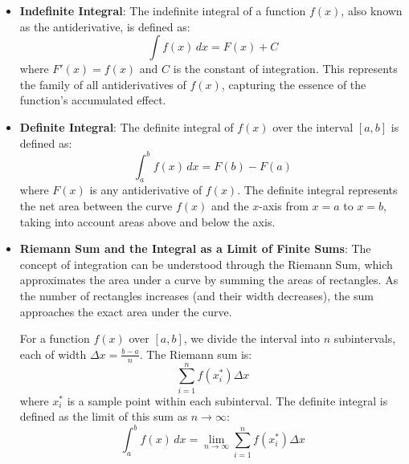 \begin{itemize}
\item \textbf{Indefinite Integral}:  
The indefinite integral of a function \( f(x) \), also known as the antiderivative, is defined as:
\[
\int f(x) \, dx = F(x) + C
\]
where \( F'(x) = f(x) \) and \( C \) is the constant of integration. This represents the family of all antiderivatives of \( f(x) \), capturing the essence of the function’s accumulated effect.

\item \textbf{Definite Integral}: 
The definite integral of \( f(x) \) over the interval \([a, b]\) is defined as:
\[
\int_a^b f(x) \, dx = F(b) - F(a)
\]
where \( F(x) \) is any antiderivative of \( f(x) \). The definite integral represents the net area between the curve \( f(x) \) and the \( x \)-axis from \( x = a \) to \( x = b \), taking into account areas above and below the axis.

\item \textbf{Riemann Sum and the Integral as a Limit of Finite Sums}: 
The concept of integration can be understood through the Riemann Sum, which approximates the area under a curve by summing the areas of rectangles. As the number of rectangles increases (and their width decreases), the sum approaches the exact area under the curve.

For a function \( f(x) \) over \([a, b]\), we divide the interval into \( n \) subintervals, each of width \( \Delta x = \frac{b - a}{n} \). The Riemann sum is:
\[
\sum_{i=1}^n f(x_i^*) \Delta x
\]
where \( x_i^* \) is a sample point within each subinterval. The definite integral is defined as the limit of this sum as \( n \to \infty \):
\[
\int_a^b f(x) \, dx = \lim_{n \to \infty} \sum_{i=1}^n f(x_i^*) \Delta x
\]


\end{itemize}
